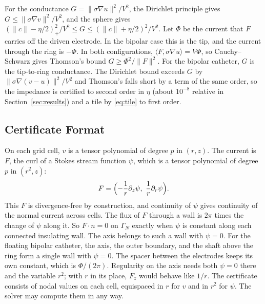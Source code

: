 \documentclass[11pt]{article}
\newcommand{\norm}[1]{\lVert #1\rVert}
\begin{document}
For the conductance $G=\norm{\sigma\nabla u}^2/V^2$, the Dirichlet principle
gives $G\le\norm{\sigma\nabla v}^2/V^2$, and the sphere gives
$(\norm{c}-\eta/2)_+^2/V^2\le G\le(\norm{c}+\eta/2)^2/V^2$. Let $\Phi$ be the
current that $F$ carries off the driven electrode. In the bipolar case this is
the tip, and the current through the ring is $-\Phi$. In both configurations,
$\langle F,\sigma\nabla u\rangle=V\Phi$, so Cauchy--Schwarz gives Thomson's
bound $G\ge\Phi^2/\norm{F}^2$. For the bipolar catheter, $G$ is the
tip-to-ring conductance. The Dirichlet bound exceeds $G$ by
$\norm{\sigma\nabla(v-u)}^2/V^2$ and Thomson's falls short by a term of the same
order, so the impedance is certified to second order in $\eta$ (about $10^{-8}$
relative in Section~\ref{sec:results}) and a tile by \eqref{eq:tile} to first order.

\subsection{Certificate Format}
On each grid cell, $v$ is a tensor polynomial of degree $p$ in $(r,z)$. The
current is $F$, the curl of a Stokes stream function $\psi$, which is a tensor
polynomial of degree $p$ in $(r^2,z)$:
\begin{equation}
F=\Bigl(-\frac{1}{r}\partial_z\psi,\ \frac{1}{r}\partial_r\psi\Bigr).
\end{equation}
This $F$ is divergence-free by construction, and continuity of $\psi$ gives
continuity of the normal current across cells. The flux of $F$ through a wall
is $2\pi$ times the change of $\psi$ along it. So $F\cdot n=0$ on $\Gamma_N$
exactly when $\psi$ is constant along each connected insulating wall. The axis
belongs to such a wall with $\psi=0$. For the floating bipolar catheter, the axis, the outer boundary, and the shaft above the ring form a single wall with
$\psi=0$. The spacer between the electrodes keeps its own constant, which is
$\Phi/(2\pi)$. Regularity on the axis needs both $\psi=0$ there and the variable
$r^2$; with $r$ in its place, $F_z$ would behave like $1/r$. The certificate
consists of nodal values on each cell, equispaced in $r$ for $v$ and in $r^2$
for $\psi$. The solver may compute them in any way.
\end{document}
